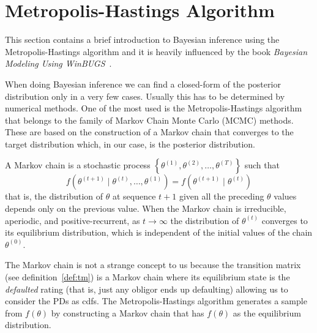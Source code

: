 \documentclass[11pt,fleqn]{book} %
\begin{document}
\section{Metropolis-Hastings Algorithm}

This section contains a brief introduction to Bayesian inference using the 
Metropolis-Hastings algorithm and it is heavily influenced by the book 
\emph{Bayesian Modeling Using WinBUGS}~\cite{ntzoufras:2009}.

When doing Bayesian inference we can find a closed-form of the posterior 
distribution only in a very few cases. Usually this has to be determined 
by numerical methods. One of the most used is the Metropolis-Hastings 
algorithm that belongs to the family of Markov Chain Monte Carlo (MCMC) 
methods. These are based on the construction of a Markov chain that converges 
to the target distribution which, in our case, is the posterior distribution.

\begin{definition}
	A Markov chain is a stochastic process 
	$\left\{\theta^{(1)},\theta^{(2)},\dots,\theta^{(T)}\right\}$ such that
	\begin{displaymath}
		f\left(\theta^{(t+1)} \mid \theta^{(t)},\dots,\theta^{(1)}\right) = 
		f\left(\theta^{(t+1)} \mid \theta^{(t)}\right)
	\end{displaymath}
	that is, the distribution of $\theta$ at sequence $t+1$ given all the 
	preceding $\theta$ values depends only on the previous value. 
	When the Markov chain is irreducible, aperiodic, and positive-recurrent, 
	as $t \to \infty$ the distribution of $\theta^{(t)}$ converges to its 
	equilibrium distribution, which is independent of the initial values 
	of the chain $\theta^{(0)}$.
\end{definition}

The Markov chain is not a strange concept to us because the transition 
matrix (see definition~\ref{def:tm}) is a Markov chain where its 
equilibrium state is the \emph{defaulted} rating (that is, just any 
obligor ends up defaulting) allowing us to consider the PDs as cdfs.
The Metropolis-Hastings algorithm generates a sample from $f(\theta)$ 
by constructing a Markov chain that has $f(\theta)$ as the equilibrium 
distribution.
\end{document}
